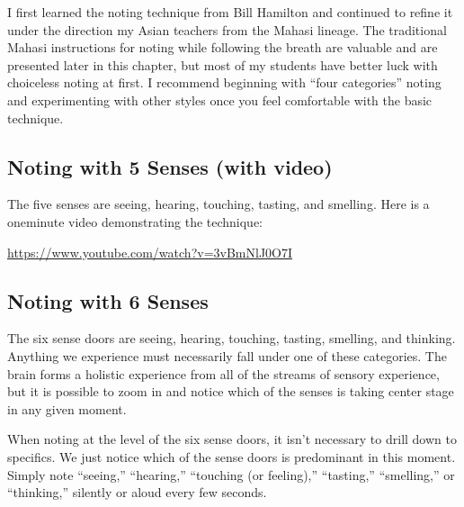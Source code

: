 \documentclass[a5paper,10pt,english]{book}
\begin{document}
\sphinxAtStartPar
I first learned the noting technique from Bill Hamilton and continued to
refine it under the direction my Asian teachers from the Mahasi lineage.
The traditional Mahasi instructions for noting while following the
breath are valuable and are presented later in this chapter, but most of
my students have better luck with choiceless noting at first. I
recommend beginning with “four categories” noting and experimenting with
other styles once you feel comfortable with the basic technique.


\subsection{Noting with 5 Senses (with video)}
\label{\detokenize{main-3:noting-with-5-senses-with-video}}
\sphinxAtStartPar
The five senses are seeing, hearing, touching, tasting, and smelling.
Here is a one\sphinxhyphen{}minute video demonstrating the technique:

\begin{center}


   \url{https://www.youtube.com/watch?v=3vBmNlJ0O7I}
\end{center}


\subsection{Noting with 6 Senses}
\label{\detokenize{main-3:noting-with-6-senses}}
\sphinxAtStartPar
The six sense doors are seeing, hearing, touching, tasting, smelling,
and thinking. Anything we experience must necessarily fall under one of
these categories. The brain forms a holistic experience from all of the
streams of sensory experience, but it is possible to zoom in and notice
which of the senses is taking center stage in any given moment.

\sphinxAtStartPar
When noting at the level of the six sense doors, it isn’t necessary to
drill down to specifics. We just notice which of the sense doors is
predominant in this moment. Simply note “seeing,” “hearing,” “touching
(or feeling),” “tasting,” “smelling,” or “thinking,” silently or aloud
every few seconds.
\end{document}
